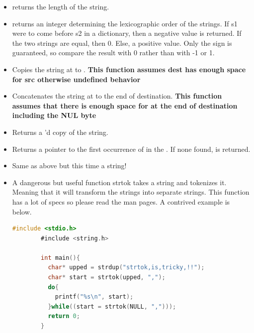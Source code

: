 \begin{itemize}

	\item {} returns the length of the string.

	\item {} returns an integer determining the lexicographic order of the strings.
    If s1 were to come before s2 in a dictionary, then a negative value is returned.
    If the two strings are equal, then 0.
    Else, a positive value.
    Only the sign is guaranteed, so compare the result with 0 rather than with -1 or 1.

	\item {} Copies the string at  to .
    \textbf{This function assumes dest has enough space for src otherwise undefined behavior}

	\item {} Concatenates the string at  to the end of destination.
    \textbf{This function assumes that there is enough space for  at the end of destination including the NUL byte}

	\item {} Returns a 'd copy of the string.

	\item {} Returns a pointer to the first occurrence of  in the .
    If none found,  is returned.

	\item {} Same as above but this time a string!

	\item {}

	  A dangerous but useful function strtok takes a string and tokenizes it.
    Meaning that it will transform the strings into separate strings.
    This function has a lot of specs so please read the man pages. A contrived example is below.

	      \begin{lstlisting}[language=C]
        #include <stdio.h>
        #include <string.h>

        int main(){
          char* upped = strdup("strtok,is,tricky,!!");
          char* start = strtok(upped, ",");
          do{
            printf("%s\n", start);
          }while((start = strtok(NULL, ",")));
          return 0;
        }
\end{lstlisting}


\end{itemize}
